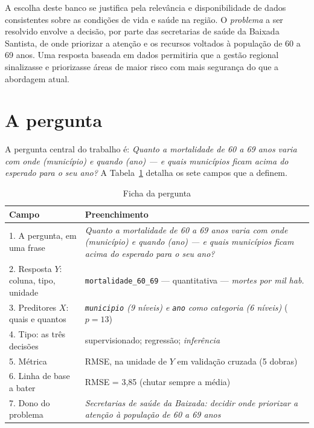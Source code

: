 \documentclass[12pt,a4paper,oneside]{article}\usepackage[]{graphicx}\usepackage[]{xcolor}
\providecommand{\fonte}[1]{\par\medskip\noindent{\footnotesize Fonte: #1}}
\begin{document}
A escolha deste banco se justifica pela relevância e disponibilidade de dados consistentes sobre as condições de vida e saúde na região. O \emph{problema} a ser resolvido envolve a decisão, por parte das secretarias de saúde da Baixada Santista, de onde priorizar a atenção e os recursos voltados à população de 60 a 69 anos. Uma resposta baseada em dados permitiria que a gestão regional sinalizasse e priorizasse áreas de maior risco com mais segurança do que a abordagem atual.

\section{A pergunta}
A pergunta central do trabalho é: \textit{Quanto a mortalidade de 60 a 69 anos varia com onde (município) e quando (ano) — e quais municípios ficam acima do esperado para o seu ano?} A Tabela~\ref{tab:ficha} detalha os sete campos que a definem.

\begin{table}[htb]
  \centering
  \caption{Ficha da pergunta}
  \label{tab:ficha}
  \small
  \begin{tabular}{@{}p{}p{}@{}}
    \toprule
    \textbf{Campo} & \textbf{Preenchimento} \\
    \midrule
    1. A pergunta, em uma frase & \textit{Quanto a mortalidade de 60 a 69 anos varia com onde (município) e quando (ano) — e quais municípios ficam acima do esperado para o seu ano?} \\
    2. Resposta $Y$: coluna, tipo, unidade & \texttt{mortalidade\_60\_69} ---
       quantitativa --- \textit{mortes por mil hab.} \\
    3. Preditores $X$: quais e quantos & \textit{\texttt{municipio} (9 níveis) e \texttt{ano} como categoria (6 níveis)} \quad ($p = \text{13}$) \\
    4. Tipo: as três decisões & supervisionado; regress\~ao;
       \textit{inferência} \\
    5. Métrica & RMSE, na unidade de $Y$ em validação cruzada (5 dobras) \\
    6. Linha de base a bater & RMSE = 3,85 \quad (chutar sempre a m\'edia) \\
    7. Dono do problema & \textit{Secretarias de saúde da Baixada: decidir onde priorizar a atenção à população de 60 a 69 anos} \\
    \bottomrule
  \end{tabular}
  \fonte{Elaborada pelos autores.}
\end{table}
\end{document}
